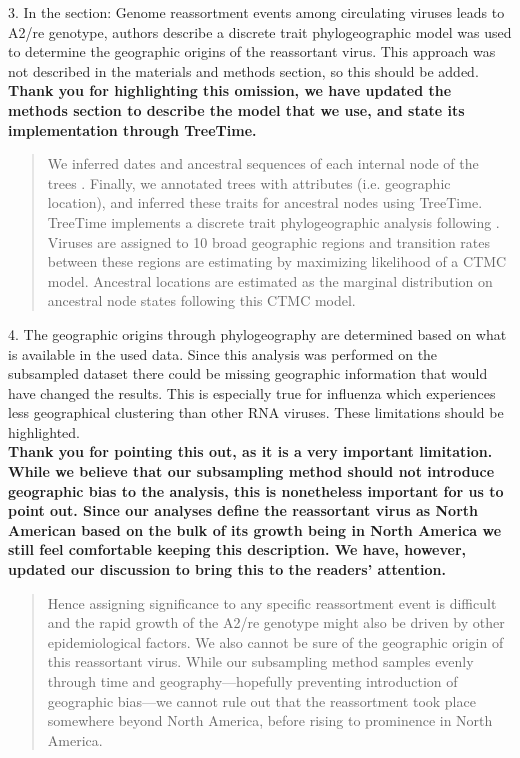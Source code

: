 \documentclass[11pt,oneside,letterpaper]{article}
\begin{document}
3. In the section: Genome reassortment events among circulating viruses leads to A2/re genotype, authors describe a discrete trait phylogeographic model was used to determine the geographic origins of the reassortant virus. This approach was not described in the materials and methods section, so this should be added.\\

\textbf{Thank you for highlighting this omission, we have updated the methods section to describe the model that we use, and state its implementation through TreeTime.}

\begin{quotation}
  We inferred dates and ancestral sequences of each internal node of the trees \citep{Sagulenko2018}.
  Finally, we annotated trees with attributes (i.e. geographic location), and inferred these traits for ancestral nodes using TreeTime.
  TreeTime \citep{TreeTime} implements a discrete trait phylogeographic analysis following \citep{Lemey2009Bayesian}.
  Viruses are assigned to 10 broad geographic regions and transition rates between these regions are estimating by maximizing likelihood of a CTMC model.
  Ancestral locations are estimated as the marginal distribution on ancestral node states following this CTMC model.
\end{quotation}

4. The geographic origins through phylogeography are determined based on what is available in the used data. Since this analysis was performed on the subsampled dataset there could be missing geographic information that would have changed the results. This is especially true for influenza which experiences less geographical clustering than other RNA viruses. These limitations should be highlighted.\\

\textbf{Thank you for pointing this out, as it is a very important limitation. While we believe that our subsampling method should not introduce geographic bias to the analysis, this is nonetheless important for us to point out. Since our analyses define the reassortant virus as North American based on the bulk of its growth being in North America we still feel comfortable keeping this description. We have, however, updated our discussion to bring this to the readers' attention.}

\begin{quotation}
  Hence assigning significance to any specific reassortment event is difficult and the rapid growth of the A2/re genotype might also be driven by other epidemiological factors.
  We also cannot be sure of the geographic origin of this reassortant virus.
  While our subsampling method samples evenly through time and geography---hopefully preventing introduction of geographic bias---we cannot rule out that the reassortment took place somewhere beyond North America, before rising to prominence in North America.
\end{quotation}
\end{document}
